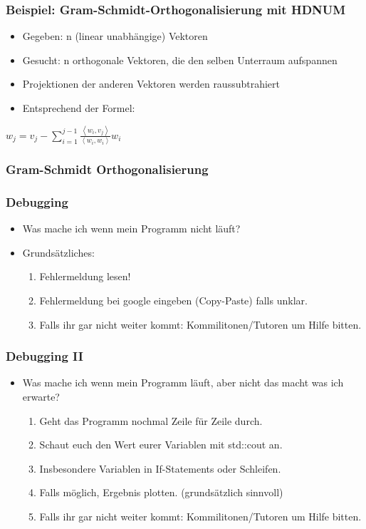\begin{frame}[fragile]
\frametitle{Beispiel: Gram-Schmidt-Orthogonalisierung mit HDNUM}
\begin{itemize}
\item Gegeben: n (linear unabhängige) Vektoren
\item Gesucht: n orthogonale Vektoren, die den selben Unterraum aufspannen
\item Projektionen der anderen Vektoren werden raussubtrahiert
\item Entsprechend der Formel:


\end{itemize}
\large
\centering
\vspace{0.5cm}
\hspace{2cm}
$ w_{j}=v_{j}-\sum_{i=1}^{j-1} \frac{\left\langle w_{i}, v_{j}\right\rangle}{\left\langle w_{i}, w_{i}\right\rangle} w_{i}$
\end{frame}


\begin{frame}
\frametitle{Gram-Schmidt Orthogonalisierung}

\end{frame}


\begin{frame}[fragile]
\frametitle{Debugging}
\begin{itemize}
\item Was mache ich wenn mein Programm nicht läuft?
\item Grundsätzliches:
\begin{enumerate}
\item Fehlermeldung lesen!
\item Fehlermeldung bei google eingeben (Copy-Paste) falls unklar.
\item Falls ihr gar nicht weiter kommt: Kommilitonen/Tutoren um Hilfe bitten.
\end{enumerate}
\end{itemize}
\end{frame}

\begin{frame}[fragile]
\frametitle{Debugging II}
\begin{itemize}
\item Was mache ich wenn mein Programm läuft, aber nicht das macht was ich erwarte?
\begin{enumerate}
\item Geht das Programm nochmal Zeile für Zeile durch.
\item Schaut euch den Wert eurer Variablen mit std::cout an.
\item Insbesondere Variablen in If-Statements oder Schleifen.
\item Falls möglich, Ergebnis plotten. (grundsätzlich sinnvoll)
\item Falls ihr gar nicht weiter kommt: Kommilitonen/Tutoren um Hilfe bitten.
\end{enumerate}
\end{itemize}
\end{frame}

